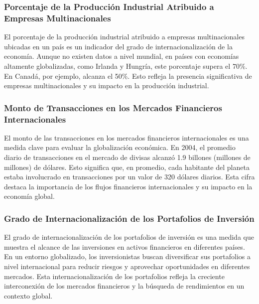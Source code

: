 \documentclass[
  jou,
  floatsintext,
  longtable,
  a4paper,
  nolmodern,
  notxfonts,
  notimes,
  12pt,
  colorlinks=true,linkcolor=blue,citecolor=blue,urlcolor=blue]{apa7}
\begin{document}
\subsubsection{Porcentaje de la Producción Industrial Atribuido a
Empresas
Multinacionales}\label{porcentaje-de-la-producciuxf3n-industrial-atribuido-a-empresas-multinacionales}

El porcentaje de la producción industrial atribuido a empresas
multinacionales ubicadas en un país es un indicador del grado de
internacionalización de la economía. Aunque no existen datos a nivel
mundial, en países con economías altamente globalizadas, como Irlanda y
Hungría, este porcentaje supera el 70\%. En Canadá, por ejemplo, alcanza
el 50\%. Esto refleja la presencia significativa de empresas
multinacionales y su impacto en la producción industrial.

\subsubsection{Monto de Transacciones en los Mercados Financieros
Internacionales}\label{monto-de-transacciones-en-los-mercados-financieros-internacionales}

El monto de las transacciones en los mercados financieros
internacionales es una medida clave para evaluar la globalización
económica. En 2004, el promedio diario de transacciones en el mercado de
divisas alcanzó 1.9 billones (millones de millones) de dólares. Esto
significa que, en promedio, cada habitante del planeta estaba
involucrado en transacciones por un valor de 320 dólares diarios. Esta
cifra destaca la importancia de los flujos financieros internacionales y
su impacto en la economía global.

\subsubsection{Grado de Internacionalización de los Portafolios de
Inversión}\label{grado-de-internacionalizaciuxf3n-de-los-portafolios-de-inversiuxf3n}

El grado de internacionalización de los portafolios de inversión es una
medida que muestra el alcance de las inversiones en activos financieros
en diferentes países. En un entorno globalizado, los inversionistas
buscan diversificar sus portafolios a nivel internacional para reducir
riesgos y aprovechar oportunidades en diferentes mercados. Esta
internacionalización de los portafolios refleja la creciente
interconexión de los mercados financieros y la búsqueda de rendimientos
en un contexto global.
\end{document}
